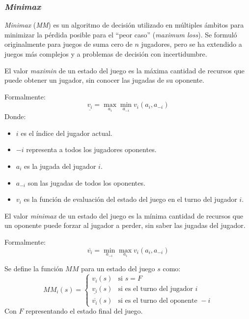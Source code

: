 \subsubsection{\textit{Minimax}}
  \textit{Minimax}\cite{fanMinimaxTheorems1953} (\textit{MM}) es un 
  algoritmo de decisión utilizado en múltiples ámbitos para minimizar la pérdida posible para 
  el \enquote{peor caso} (\textit{maximum loss}). 
  Se formuló originalmente para juegos de suma cero de \(n\) jugadores, pero se ha extendido a
  juegos más complejos y a problemas de decisión con incertidumbre.

  \begin{definition}
    El valor \textit{maximin} de un estado del juego es la máxima cantidad de recursos que puede 
    obtener un jugador, sin conocer las jugadas de su oponente.

    Formalmente:
    \[
      \underline{v_{i}} = \max_{a_{i}}\min_{a_{-i}}v_{i}(a_{i},a_{-i})
    \]
    Donde:
    \begin{itemize}
      \item \(i\) es el índice del jugador actual.
      \item \(-i\) representa a todos los jugadores oponentes.
      \item \(a_i\) es la jugada del jugador \(i\).
      \item \(a_{-i}\) son las jugadas de todos los oponentes.
      \item \(v_i\) es la función de evaluación del estado del juego en el turno del jugador 
        \(i\).
    \end{itemize}
  \end{definition}

  \begin{definition}
    El valor \textit{minimax} de un estado del juego es la mínima cantidad de recursos que un 
    oponente puede forzar al jugador a perder, sin saber las jugadas del jugador.
    
    Formalmente:
    \[
      \overline{v_{i}} = 
        \min_{a_{-i}}\max_{a_{i}}{v_{i}(a_{i}, a_{-i})}
    \]
  \end{definition}

  \begin{definition}
    Se define la función \(MM\) para un estado del juego \(s\) como:
    \[
      MM_i(s) = \begin{cases}
        v_i(s) & \text{si } s = F  \\
        \underline{v_{i}}(s) & \text{si es el turno del jugador } i \\
        \overline{v_{i}}(s) & \text{si es el turno del oponente } -i
      \end{cases}  
    \]
    Con \(F\) representando el estado final del juego.
  \end{definition}


